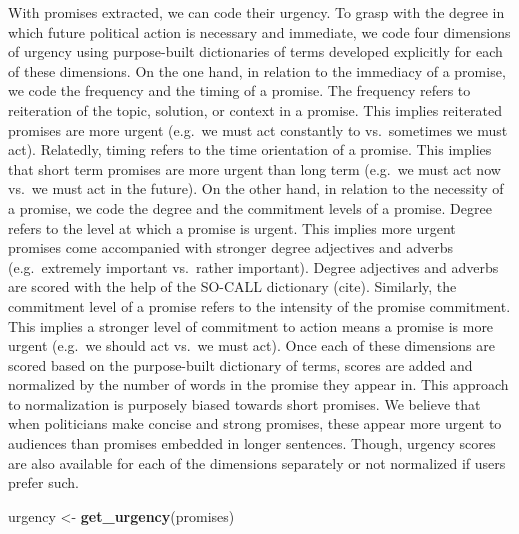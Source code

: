 \documentclass[
]{article}
\newenvironment{Shaded}{\begin{snugshade}}{\end{snugshade}}
\newcommand{\FunctionTok}[1]{\textcolor[rgb]{0.13,0.29,0.53}{\textbf{#1}}}
\newcommand{\NormalTok}[1]{#1}
\newcommand{\OtherTok}[1]{\textcolor[rgb]{0.56,0.35,0.01}{#1}}
\begin{document}
With promises extracted, we can code their urgency. To grasp with the
degree in which future political action is necessary and immediate, we
code four dimensions of urgency using purpose-built dictionaries of
terms developed explicitly for each of these dimensions. On the one
hand, in relation to the immediacy of a promise, we code the frequency
and the timing of a promise. The frequency refers to reiteration of the
topic, solution, or context in a promise. This implies reiterated
promises are more urgent (e.g.~we must act constantly to vs.~sometimes
we must act). Relatedly, timing refers to the time orientation of a
promise. This implies that short term promises are more urgent than long
term (e.g.~we must act now vs.~we must act in the future). On the other
hand, in relation to the necessity of a promise, we code the degree and
the commitment levels of a promise. Degree refers to the level at which
a promise is urgent. This implies more urgent promises come accompanied
with stronger degree adjectives and adverbs (e.g.~extremely important
vs.~rather important). Degree adjectives and adverbs are scored with the
help of the SO-CALL dictionary (cite). Similarly, the commitment level
of a promise refers to the intensity of the promise commitment. This
implies a stronger level of commitment to action means a promise is more
urgent (e.g.~we should act vs.~we must act). Once each of these
dimensions are scored based on the purpose-built dictionary of terms,
scores are added and normalized by the number of words in the promise
they appear in. This approach to normalization is purposely biased
towards short promises. We believe that when politicians make concise
and strong promises, these appear more urgent to audiences than promises
embedded in longer sentences. Though, urgency scores are also available
for each of the dimensions separately or not normalized if users prefer
such.

\begin{Shaded}
\begin{Highlighting}[]
\NormalTok{urgency }\OtherTok{\textless{}{-}} \FunctionTok{get\_urgency}\NormalTok{(promises)}
\end{Highlighting}
\end{Shaded}
\end{document}
